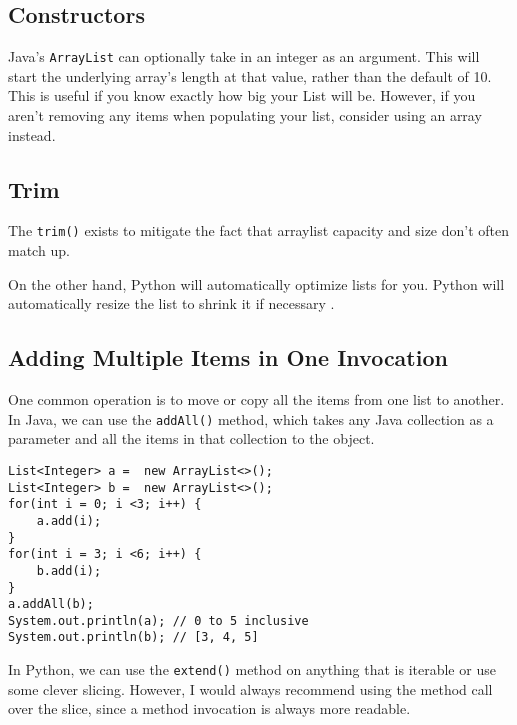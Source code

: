 

\subsection{Constructors}
Java's \texttt{ArrayList} can optionally take in an integer as an argument.
This will start the underlying array's length at that value, rather than the default of 10.
This is useful if you know exactly how big your List will be.  
However, if you aren't removing any items when populating your list, consider using an array instead.

\subsection{Trim}

The \texttt{trim()} exists to mitigate the fact that arraylist capacity and size don't often match up.



On the other hand, Python will automatically optimize lists for you.  Python will automatically resize the list to shrink it if necessary \cite{py-list-source}.


\subsection{Adding Multiple Items in One Invocation}
One common operation is to move or copy all the items from one list to another.
In Java, we can use the \texttt{addAll()} method, which takes any Java collection as a parameter and all the items in that collection to the object.

\begin{verbatim}
List<Integer> a =  new ArrayList<>();
List<Integer> b =  new ArrayList<>();
for(int i = 0; i <3; i++) { 
	a.add(i); 
}
for(int i = 3; i <6; i++) { 
	b.add(i); 
}
a.addAll(b);
System.out.println(a); // 0 to 5 inclusive
System.out.println(b); // [3, 4, 5]
\end{verbatim}

In Python, we can use the \texttt{extend()} method on anything that is iterable or use some clever slicing.  However, I would always recommend using the method call over the slice, since a method invocation is always more readable.


